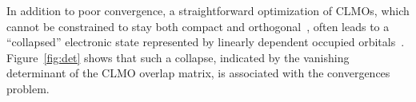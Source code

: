 \documentclass[aps,prl,twocolumn,reprint,amsmath,amssymb]{revtex4-1}
\begin{document}

In addition to poor convergence, a straightforward optimization of CLMOs, which cannot be constrained to stay both compact and orthogonal~\cite{stoll, RZZK}, often leads to a ``collapsed'' electronic state represented by linearly dependent occupied orbitals~\cite{ordejon1995linear}. 
%
Figure~\ref{fig:det} shows that such a collapse, indicated by the vanishing determinant of the CLMO overlap matrix, is associated with 
the convergences problem. 
\end{document}
